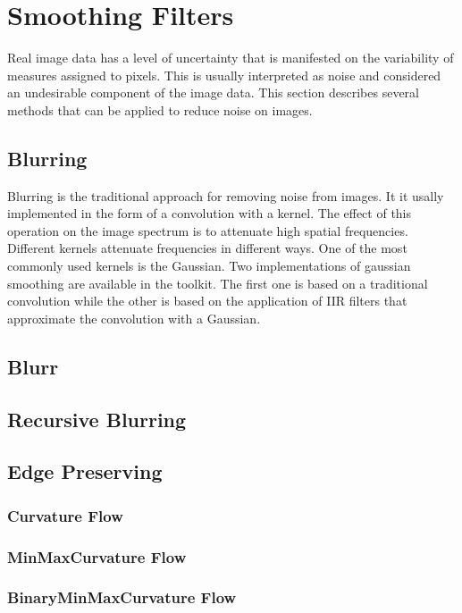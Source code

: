 \section{Smoothing Filters}
\label{sec:SmoothingFilters}

Real image data has a level of uncertainty that is manifested on the
variability of measures assigned to pixels. This is usually interpreted as
noise and considered an undesirable component of the image data. This section
describes several methods that can be applied to reduce noise on images.

\subsection{Blurring}
\label{sec:BlurringFilters}

Blurring is the traditional approach for removing noise from images. It it
usally implemented in the form of a convolution with a kernel. The effect of
this operation on the image spectrum is to attenuate high spatial frequencies.
Different kernels attenuate frequencies in different ways. One of the most
commonly used kernels is the Gaussian. Two implementations of gaussian
smoothing are available in the toolkit. The first one is based on a traditional
convolution while the other is based on the application of IIR filters that
approximate the convolution with a Gaussian. 

\subsection{Blurr}
\label{sec:GaussianConvolutionFilter}

\subsection{Recursive Blurring}
\label{sec:RecursiveGaussianSmoothingFilter}


\subsection{Edge Preserving}
\label{sec:EdgePreservingFilters}


\subsubsection{Curvature Flow}
\label{sec:CurvatureFlowImageFilter}




\subsubsection{MinMaxCurvature Flow}
\label{sec:MinMaxCurvatureFlowImageFilter}





\subsubsection{BinaryMinMaxCurvature Flow}
\label{sec:BinaryMinMaxCurvatureFlowImageFilter}



